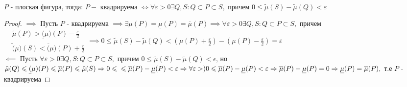 \documentclass[../main.tex]{subfiles}
\begin{document}
\newpage
{}

\begin{theorem}
    $P$ - плоская фигура, тогда: $P - $ квадрируема $\Leftrightarrow \forall \varepsilon>0 \exists Q,S: Q\subset P \subset S,$ причем  $0\leqslant \tilde{\mu}(S) - \tilde{\mu}(Q)<\varepsilon$
    
\end{theorem}
\begin{proof}
    $\implies$ Пусть $P$ - квадрируема $\implies \exists \mu(P)=\underline{\mu}(P)=\overline{\mu}(P)\implies\forall \varepsilon>0 \exists Q,S : Q\subset P \subset S, $ причем $\begin{aligned}
         &\tilde{\mu}(P)>\underline(\mu)(P) - \frac{\varepsilon}{2} \\ 
         &\tilde(\mu)(S)<\overline(\mu)(P)+\frac{\varepsilon}{2}
    \end{aligned}\implies 0\leqslant \tilde{\mu}(S) - \tilde{\mu}(Q)<(\mu(P)+ \frac{\varepsilon}{2})-(\mu(P)-\frac{\varepsilon}{2})=\varepsilon$
    \\$\impliedby $ Пусть $\forall \varepsilon>0 \exists Q,S : Q\subset P \subset S,$ причем $0\leqslant \tilde{\mu}(S)-\tilde{\mu}(Q)<\epsilon$, но $\tilde{\mu}(Q)\leqslant \underline(\mu)(P)\leqslant \overline{\mu}(P) \leqslant \tilde{\mu}(S)\implies 0\leqslant\\ \leqslant  \overline{\mu}(P)-\underline{\mu}(P)<\varepsilon\implies \forall \varepsilon>) 0\leqslant \overline{\mu}(P) - \underline{\mu}(P)<\varepsilon\implies \overline{\mu}(P)-\underline{\mu}(P)=0 \implies \underline{\mu}(P)=\overline{\mu}(P),$ т.е $P$ - квадрируема


\end{proof}
\end{document}
